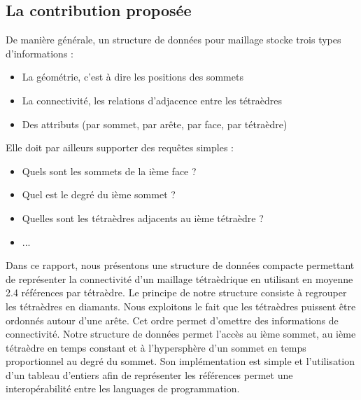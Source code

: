 \subsection*{La contribution proposée}
\noindent
De manière générale, un structure de données pour maillage stocke trois types d'informations :
\begin{itemize}
\item La géométrie, c'est à dire les positions des sommets
\item La connectivité, les relations d'adjacence entre les tétraèdres
\item Des attributs (par sommet, par arête, par face, par tétraèdre)\\
\end{itemize}
Elle doit par ailleurs supporter des requêtes simples :
\begin{itemize}
\item Quels sont les sommets de la ième face ?
\item Quel est le degré du ième sommet ?
\item Quelles sont les tétraèdres adjacents au ième tétraèdre ?
\item ...
\end{itemize}
Dans ce rapport, nous présentons une structure de données compacte permettant de représenter la connectivité d'un maillage tétraèdrique en utilisant en moyenne 2.4 références par tétraèdre. Le principe de notre structure consiste à regrouper les tétraèdres en diamants. Nous exploitons le fait que les tétraèdres puissent être ordonnés autour d'une arête. Cet ordre permet d'omettre des informations de connectivité. Notre structure de données permet l'accès au ième sommet, au ième tétraèdre en temps constant et à l'hypersphère d'un sommet en temps proportionnel au degré du sommet. Son implémentation est simple et l'utilisation d'un tableau d'entiers afin de représenter les références permet une interopérabilité entre les languages de programmation.


